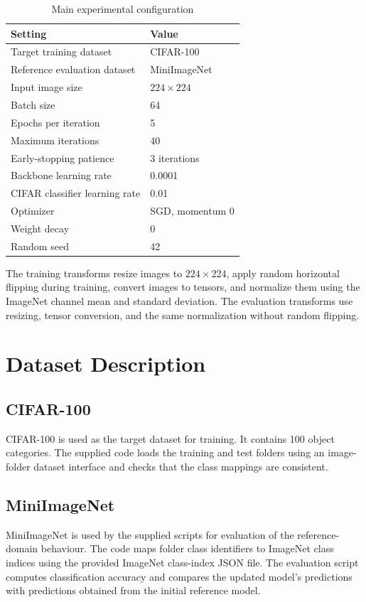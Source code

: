 \documentclass[12pt,a4paper]{report}
\begin{document}
\begin{table}[H]
\centering
\caption{Main experimental configuration}
\begin{tabular}{p{}p{}}
\toprule
\textbf{Setting} & \textbf{Value}\\
\midrule
Target training dataset & CIFAR-100\\
Reference evaluation dataset & MiniImageNet\\
Input image size & $224\times224$\\
Batch size & 64\\
Epochs per iteration & 5\\
Maximum iterations & 40\\
Early-stopping patience & 3 iterations\\
Backbone learning rate & 0.0001\\
CIFAR classifier learning rate & 0.01\\
Optimizer & SGD, momentum 0\\
Weight decay & 0\\
Random seed & 42\\
\bottomrule
\end{tabular}
\end{table}

The training transforms resize images to $224\times224$, apply random
horizontal flipping during training, convert images to tensors, and
normalize them using the ImageNet channel mean and standard deviation.
The evaluation transforms use resizing, tensor conversion, and the
same normalization without random flipping.

\section{Dataset Description}
\subsection{CIFAR-100}
CIFAR-100 is used as the target dataset for training. It contains
100 object categories. The supplied code loads the training and test
folders using an image-folder dataset interface and checks that the
class mappings are consistent.

\subsection{MiniImageNet}
MiniImageNet is used by the supplied scripts for evaluation of the
reference-domain behaviour. The code maps folder class identifiers to
ImageNet class indices using the provided ImageNet class-index JSON
file. The evaluation script computes classification accuracy and
compares the updated model's predictions with predictions obtained
from the initial reference model.
\end{document}
